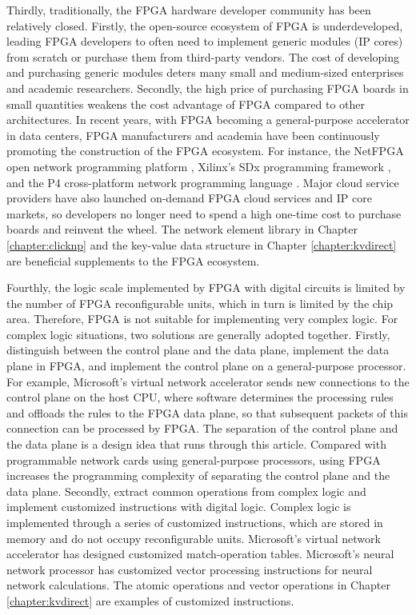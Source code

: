 Thirdly, traditionally, the FPGA hardware developer community has been relatively closed. Firstly, the open-source ecosystem of FPGA is underdeveloped, leading FPGA developers to often need to implement generic modules (IP cores) from scratch or purchase them from third-party vendors. The cost of developing and purchasing generic modules deters many small and medium-sized enterprises and academic researchers. Secondly, the high price of purchasing FPGA boards in small quantities weakens the cost advantage of FPGA compared to other architectures. In recent years, with FPGA becoming a general-purpose accelerator in data centers, FPGA manufacturers and academia have been continuously promoting the construction of the FPGA ecosystem. For instance, the NetFPGA open network programming platform \cite{netfpga}, Xilinx's SDx programming framework \cite{sdaccel}, and the P4 cross-platform network programming language \cite{bosshart2014p4}. Major cloud service providers have also launched on-demand FPGA cloud services and IP core markets, so developers no longer need to spend a high one-time cost to purchase boards and reinvent the wheel. The network element library in Chapter \ref{chapter:clicknp} and the key-value data structure in Chapter \ref{chapter:kvdirect} are beneficial supplements to the FPGA ecosystem.

Fourthly, the logic scale implemented by FPGA with digital circuits is limited by the number of FPGA reconfigurable units, which in turn is limited by the chip area. Therefore, FPGA is not suitable for implementing very complex logic. For complex logic situations, two solutions are generally adopted together.
Firstly, distinguish between the control plane and the data plane, implement the data plane in FPGA, and implement the control plane on a general-purpose processor. For example, Microsoft's virtual network accelerator \cite{smartnic} sends new connections to the control plane on the host CPU, where software determines the processing rules and offloads the rules to the FPGA data plane, so that subsequent packets of this connection can be processed by FPGA. The separation of the control plane and the data plane is a design idea that runs through this article. Compared with programmable network cards using general-purpose processors, using FPGA increases the programming complexity of separating the control plane and the data plane.
Secondly, extract common operations from complex logic and implement customized instructions with digital logic. Complex logic is implemented through a series of customized instructions, which are stored in memory and do not occupy reconfigurable units. Microsoft's virtual network accelerator \cite{smartnic} has designed customized match-operation tables. Microsoft's neural network processor \cite{accelerating-deep-convolutional-neural-networks-using-specialized-hardware} has customized vector processing instructions for neural network calculations. The atomic operations and vector operations in Chapter \ref{chapter:kvdirect} are examples of customized instructions.

